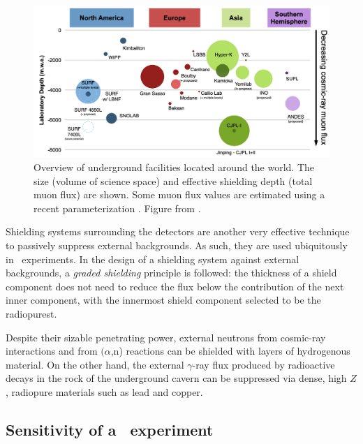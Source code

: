 \begin{figure}[t!b!]
\begin{center}
\includegraphics[width=\textwidth]{img/UndergroundFacilities.png}
\caption{\label{fig:underground_facilities}Overview of underground facilities located around the world. The size (volume of science space) and effective shielding depth (total muon flux) are shown. Some muon flux values are estimated using a recent parameterization \cite{JNE:2020bwn}. Figure from \cite{Baudis:2022pzb,Heise:2022iaf}.}
\end{center}
\end{figure}

Shielding systems surrounding the detectors are another very effective technique to passively suppress external backgrounds. As such, they are used ubiquitously in \bbonu\ experiments. In the design of a shielding system against external backgrounds, a \emph{graded shielding} principle is followed: the thickness of a shield component does not need to reduce the flux below the contribution of the next inner component, with the innermost shield component selected to be the radiopurest.

Despite their sizable penetrating power, external neutrons from cosmic-ray interactions and from $(\alpha$,n) reactions can be shielded with layers of hydrogenous material. On the other hand, the external $\gamma$-ray flux produced by radioactive decays in the rock of the underground cavern can be suppressed via dense, high $Z$, radiopure materials such as lead and copper. 


\subsection{Sensitivity of a \bbonu\ experiment} \label{subsec:sensitivitydefinition}

